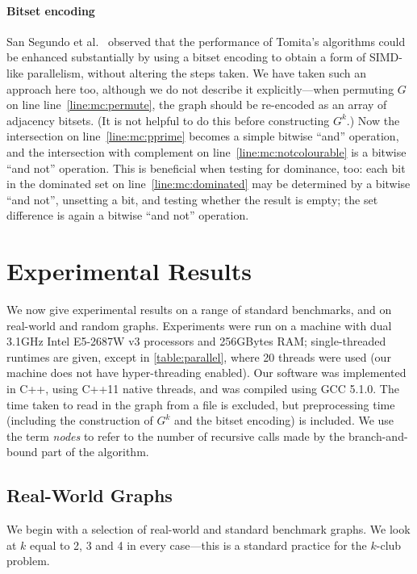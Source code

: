 \documentclass[letterpaper]{article}
\newcommand{\mcline}[1]{line~\ref{line:mc:#1}}
\begin{document}
\paragraph{Bitset encoding} San Segundo et al.\  observed
that the performance of Tomita's algorithms could be enhanced substantially by using a bitset
encoding to obtain a form of SIMD-like parallelism, without altering the steps taken. We have taken
such an approach here too, although we do not describe it explicitly---when permuting $G$ on line
\mcline{permute}, the graph should be re-encoded as an array of adjacency bitsets. (It is not
helpful to do this before constructing $G^k$.) Now the intersection on \mcline{pprime} becomes a
simple bitwise ``and'' operation, and the intersection with complement on \mcline{notcolourable} is
a bitwise ``and not'' operation. This is beneficial when testing for dominance, too: each bit in the
dominated set on \mcline{dominated} may be determined by a bitwise ``and not'', unsetting a bit, and
testing whether the result is empty; the set difference is again a bitwise ``and not'' operation.

\section{Experimental Results}

We now give experimental results on a range of standard benchmarks, and on real-world and random
graphs. Experiments were run on a machine with dual 3.1GHz Intel E5-2687W v3 processors and
256GBytes RAM; single-threaded runtimes are given, except in \cref{table:parallel}, where 20 threads
were used (our machine does not have hyper-threading enabled). Our software was implemented in C++,
using C++11 native threads, and was compiled using GCC 5.1.0. The time taken to read in the graph
from a file is excluded, but preprocessing time (including the construction of $G^k$ and the bitset
encoding) is included. We use the term \emph{nodes} to refer to the number of recursive calls made
by the branch-and-bound part of the algorithm.

\subsection{Real-World Graphs}

We begin with a selection of real-world and standard benchmark graphs. We look at $k$ equal to 2, 3
and 4 in every case---this is a standard practice for the $k$-club problem.
\end{document}
